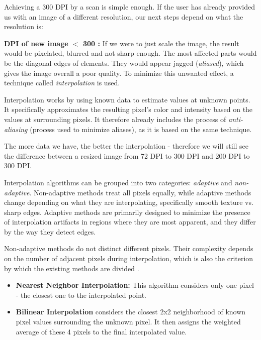 Achieving a 300 DPI by a scan is simple enough. If the user has already provided us with an image of a different resolution, our next steps depend on what the resolution is:
\begin{description}
\item\textbf {DPI of new image $<$ 300 : } If we were to just scale the image, the result would be pixelated, blurred and not sharp enough. The most affected parts would be the diagonal edges of elements. They would appear jagged (\emph{aliased}), which gives the image overall a poor quality. To minimize this unwanted effect, a technique called \emph{interpolation} is used.

Interpolation works by using known data to estimate values at unknown points. It specifically approximates the resulting pixel's color and intensity based on the values at surrounding pixels. It therefore already includes the process of \emph{anti-aliasing} (process used to minimize aliases), as it is based on the same technique.

The more data we have, the better the interpolation - therefore we will still see the difference between a resized image from 72 DPI to 300 DPI and 200 DPI to 300 DPI.

Interpolation algorithms can be grouped into two categories: \emph{adaptive} and \emph{non-adaptive}. Non-adaptive methods treat all pixels equally, while adaptive methods change depending on what they are interpolating, specifically smooth texture vs. sharp edges. Adaptive methods are primarily designed to minimize the presence of interpolation artifacts in regions where they are most apparent, and they differ by the way they detect edges.

Non-adaptive methods do not distinct different pixels. Their complexity depends on the number of adjacent pixels during interpolation, which is also the criterion by which the existing methods are divided \citep{interpolation}. 

\begin{itemize}
\item\textbf {Nearest Neighbor Interpolation: } This algorithm considers only one pixel - the closest one to the interpolated point.

\item\textbf {Bilinear Interpolation } considers the closest 2x2 neighborhood of known pixel values surrounding the unknown pixel. It then assigns the weighted average of these 4 pixels to the final interpolated value.


\end{itemize}
\end{description}
